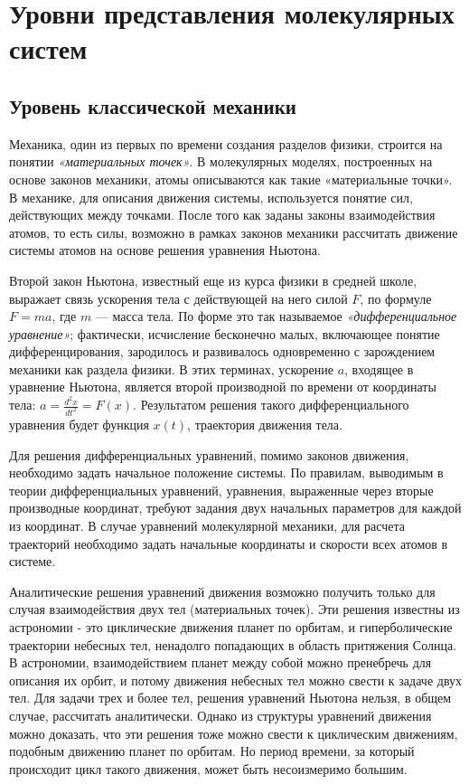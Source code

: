 \section{Уровни представления молекулярных систем}

\subsection{Уровень классической механики}

Механика, один из первых по времени создания разделов физики, строится на понятии \textit{«материальных точек»}. В молекулярных моделях, построенных на основе законов механики, атомы описываются как такие «материальные точки». В механике, для описания движения системы, используется понятие сил, действующих между точками. После того как заданы законы взаимодействия атомов, то есть силы, возможно в рамках законов механики рассчитать движение системы атомов на основе решения уравнения Ньютона.

Второй закон Ньютона, известный еще из курса физики в средней школе, выражает связь ускорения тела с действующей на него силой $F$, по формуле $F = m a$, где $m$ — масса тела. По форме это так называемое \textit{«дифференциальное уравнение»}; фактически, исчисление бесконечно малых, включающее понятие дифференцирования, зародилось и развивалось одновременно с зарождением механики как раздела физики. В этих терминах, ускорение $a$, входящее в уравнение Ньютона, является второй производной по времени от координаты тела: $a = \frac{d^2x}{dt^2} = F(x)$. Результатом решения такого дифференциального уравнения будет функция $x(t)$, траектория движения тела. 

Для решения дифференциальных уравнений, помимо законов движения, необходимо задать начальное положение системы. По правилам, выводимым в теории дифференциальных уравнений, уравнения, выраженные через вторые производные координат, требуют задания двух начальных параметров для каждой из координат. В случае уравнений молекулярной механики, для расчета траекторий необходимо задать начальные координаты и скорости всех атомов в системе.

Аналитические решения уравнений движения возможно получить только для случая взаимодействия двух тел (материальных точек). Эти решения известны из астрономии - это циклические движения планет по орбитам,  и гиперболические траектории небесных тел, ненадолго попадающих в область притяжения Солнца. В астрономии, взаимодействием планет между собой можно пренебречь для описания их орбит, и потому движения небесных тел можно свести к задаче двух тел. Для задачи трех и более тел, решения уравнений Ньютона нельзя, в общем случае, рассчитать аналитически. Однако из структуры уравнений движения можно доказать, что эти решения тоже можно свести к циклическим движениям, подобным движению планет по орбитам. Но период времени, за который происходит цикл такого движения, может быть несоизмеримо большим.

